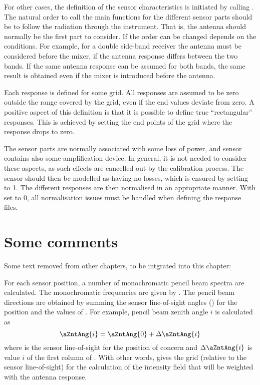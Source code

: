 For other cases, the definition of the sensor characteristics is initiated by
calling . The natural order to call the main
functions for the different sensor parts should be to follow the radiation
through the instrument. That is, the antenna should normally be the first part
to consider. If the order can be changed depends on the conditions. For
example, for a double side-band receiver the antenna must be considered before
the mixer, if the antenna response differs between the two bands. If the same
antenna response can be assumed for both bands, the same result is obtained
even if the mixer is introduced before the antenna.

Each response is defined for some grid. All responses are assumed to be zero
outside the range covered by the grid, even if the end values deviate from
zero. A positive aspect of this definition is that it is possible to define true
``rectangular'' responses. This is achieved by setting the end points of the
grid where the response drops to zero.

The sensor parts are normally associated with some loss of power, and sensor
contains also some amplification device. In general, it is not needed to
consider these aspects, as such effects are cancelled out by the calibration
process. The sensor should then be modelled as having no losses, which is
ensured by setting  to 1. The different responses are
then normalised in an appropriate manner. With  set to
0, all normalisation issues must be handled when defining the response files.


\section{Some comments}

Some text removed from other chapters, to be intgrated into this chapter:

For each sensor position, a number of monochromatic pencil beam
spectra are calculated. The monochromatic frequencies are given by
. The pencil
beam directions are obtained by summing the sensor line-of-sight
angles () for the position and the values of
. For
example, pencil beam zenith angle $i$ is calculated as
\begin{equation}
  \aZntAng{i} = \aZntAng{0} + \Delta\aZntAng{i}
  \label{eq:fm_defs:psi_grid}
\end{equation}
where  is the sensor line-of-sight for the position of
concern and $\Delta\aZntAng{i}$ is value $i$ of the first column of
.  With other words,
 gives
the grid (relative to the sensor line-of-sight) for the calculation of
the intensity field that will be weighted with the antenna response.


